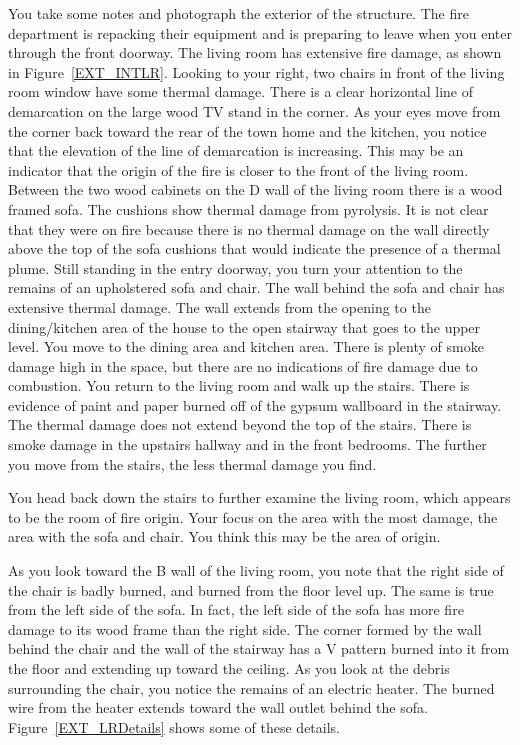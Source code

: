 \documentclass[twoside]{uocthesis}
\begin{document}
{You take some notes and photograph the exterior of the structure.  The fire department is repacking their equipment and is preparing to leave when you enter through the front doorway.  The living room has extensive fire damage, as shown in Figure~\ref{EXT_INTLR}.  Looking to your right, two chairs in front of the living room window have some thermal damage.  There is a clear horizontal line of demarcation on the large wood TV stand in the corner.  As your eyes move from the corner back toward the rear of the town home and the kitchen, you notice that the elevation of the line of demarcation is increasing.  This may be an indicator that the origin of the fire is closer to the front of the living room.  Between the two wood cabinets on the D wall of the living room there is a wood framed sofa.  The cushions show thermal damage from pyrolysis.  It is not clear that they were on fire because there is no thermal damage on the wall directly above the top of the sofa cushions that would indicate the presence of a thermal plume.  Still standing in the entry doorway, you turn your attention to the remains of an upholstered sofa and chair.  The wall behind the sofa and chair has extensive thermal damage.  The wall extends from the opening to the dining/kitchen area of the house to the open stairway that goes to the upper level.  You move to the dining area and kitchen area.  There is plenty of smoke damage high in the space, but there are no indications of fire damage due to combustion.  You return to the living room and walk up the stairs.  There is evidence of paint and paper burned off of the gypsum wallboard in the stairway.  The thermal damage does not extend beyond the top of the stairs.  There is smoke damage in the upstairs hallway and in the front bedrooms. The further you move from the stairs, the less thermal damage you find.  

You head back down the stairs to further examine the living room, which appears to be the room of fire origin. Your focus on the area with the most damage, the area with the sofa and chair.  You think this may be the area of origin.  

As you look toward the B wall of the living room, you note that the right side of the chair is badly burned, and burned from the floor level up.  The same is true from the left side of the sofa.  In fact, the left side of the sofa has more fire damage to its wood frame than the right side.  The corner formed by the wall behind the chair and the wall of the stairway has a V pattern burned into it from the floor and extending up toward the ceiling.  As you look at the debris surrounding the chair, you notice the remains of an electric heater.  The burned wire from the heater extends toward the wall outlet behind the sofa. Figure~\ref{EXT_LRDetails} shows some of these details.

}
\end{document}
